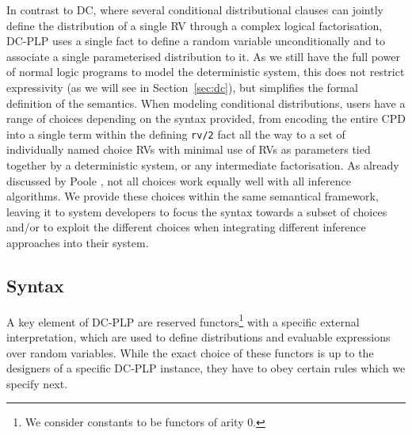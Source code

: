 In contrast to DC, where several conditional distributional clauses can jointly define the distribution of a single RV through a complex logical factorisation, DC-PLP uses a single fact to define a random variable unconditionally and to associate a single parameterised distribution to it. As we still have the full power of normal logic programs to model the deterministic system, this does not restrict expressivity (as we will see in Section~\ref{sec:dc}), but simplifies the formal definition of the semantics. When modeling conditional distributions, users have a range of choices depending on the syntax provided, from encoding the entire CPD into a single term within the defining \verb|rv/2| fact all the way to a set of individually named choice RVs with minimal use of RVs as parameters tied together by a deterministic system, or any intermediate factorisation. As already discussed by Poole \cite{poole2010probabilistic}, not all choices work equally well with all inference algorithms. We provide these choices within the same semantical framework, leaving it to system developers to focus the syntax towards a subset of choices and/or to exploit the different choices when integrating different inference approaches into their system.

\subsection{Syntax}
A key element of DC-PLP are reserved functors\footnote{We consider constants to be functors of arity 0.} with a specific external interpretation, which are used to define distributions and evaluable expressions over random variables. While the exact choice of these functors is up to the designers of a specific DC-PLP instance, they have to obey certain rules which we specify next.

